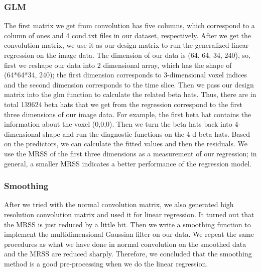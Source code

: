 \subsubsection {GLM}
The first matrix we get from convolution has five columns, which correspond to a column of ones and 4 cond.txt files in our dataset, respectively. After we get the convolution matrix, we use it as our design matrix to run the generalized linear regression on the image data. The dimension of our data is (64, 64, 34, 240), so, first we reshape our data into 2 dimensional array, which has the shape of (64*64*34, 240); the first dimension corresponds to 3-dimensional voxel indices and the second dimension corresponds to the time slice. Then we pass our design matrix into the glm function to calculate the related beta hats. Thus, there are in total 139624 beta hats that we get from the regression correspond to the first three dimensions of our image data. For example, the first beta hat contains the information about the voxel (0,0,0). Then we turn the beta hats back into 4-dimensional shape and run the diagnostic functions on the 4-d beta hats. Based on the predictors, we can calculate the fitted values and then the residuals. We use the MRSS of the first three dimensions as a measurement of our regression; in general, a smaller MRSS indicates a better performance of the regression model. 

\subsubsection {Smoothing}
After we tried with the normal convolution matrix, we also generated high resolution convolution matrix and used it for linear regression. It turned out that the MRSS is just reduced by a little bit. Then we write a smoothing function to implement the multidimensional Gaussian filter on our data. We repeat the same procedures as what we have done in normal convolution on the smoothed data and the MRSS are reduced sharply. Therefore, we concluded that the smoothing method is a good pre-processing when we do the linear regression. 

